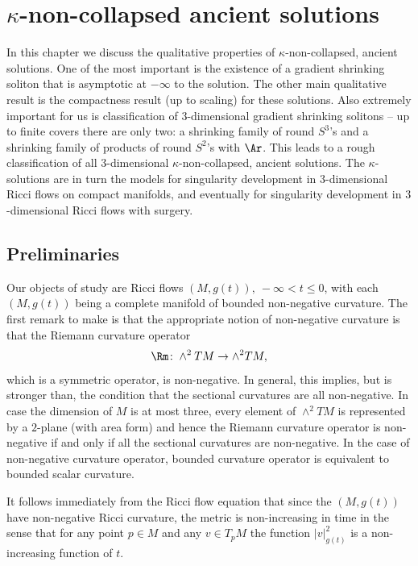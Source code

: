 \chapter{$\kappa$-non-collapsed ancient solutions}\label{chap:kappa-ancient-solutions}
\label{kappasect}

 In this chapter we discuss the qualitative properties of
$\kappa$-non-collapsed, ancient solutions. One of the most important is the
existence of a gradient shrinking soliton that is asymptotic at $-\infty$ to
the solution. The other main qualitative result is the compactness result (up
to scaling) for these solutions. Also extremely important for us is
classification of $3$-dimensional gradient shrinking solitons -- up to finite
covers there are only two: a shrinking family of round $S^3$'s and a shrinking
family of products of round $S^2$'s with $\Ar$. This leads to a rough
classification of all $3$-dimensional $\kappa$-non-collapsed, ancient
solutions. The $\kappa$-solutions are in turn the models for singularity
development in $3$-dimensional Ricci flows on compact manifolds, and eventually
for singularity development in $3$-dimensional Ricci flows with surgery.

\section{Preliminaries}

Our objects of study are Ricci flows $(M,g(t)),\ -\infty<t\le 0$,
with each $(M,g(t))$ being a complete manifold of bounded
non-negative curvature. The first remark to make is that the
appropriate notion of non-negative curvature is that the Riemann
curvature operator
$$\Rm\colon \wedge^2TM\to \wedge^2TM,$$
which is a symmetric operator, is non-negative. In general, this
implies, but is stronger than, the condition that the sectional
curvatures are all non-negative. In case the dimension of $M$ is at
most three, every element of $\wedge^2TM$ is represented by a
$2$-plane (with area form) and hence the Riemann curvature operator
is non-negative if and only if all the sectional curvatures are
non-negative.  In the case of non-negative curvature operator,
bounded curvature operator is equivalent to bounded scalar
curvature.

It follows immediately from the Ricci flow equation that since the $(M,g(t))$
have non-negative Ricci curvature,  the metric is non-increasing in time in the
sense that for any point $p\in M$ and any $v\in T_pM$ the function
$|v|^2_{g(t)}$ is a non-increasing function of $t$.

